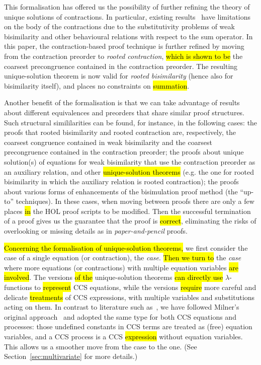 This formalisation has offered us the possibility of
further refining the theory of unique solutions of contractions.
In particular,  existing results~\cite{sangiorgi2017equations} have
limitations on the body of the contractions due to the
substitutivity problems of weak bisimilarity and other behavioural relations with respect
to the sum operator.
In this paper, the contraction-based proof technique is further
refined by moving from the contraction preorder to
\emph{rooted contraction}, \hl{which is shown to be} the coarsest
precongruence contained in the contraction preorder.
The resulting unique-solution theorem is now valid for
\emph{rooted bisimilarity} (hence also for bisimilarity itself), and places no 
constraints on \hl{summation}.

Another benefit of the formalisation is 
that we can take advantage of results about different 
equivalences and preorders that share similar proof structures.
Such structural simililarities can be found, for instance, in the
following cases: the proofs that rooted bisimilarity and rooted
contraction are, respectively, the coarsest congruence contained in
weak bisimilarity and the coarsest precongruence contained in the
contraction preorder; the proofs about unique solution(s) of equations
for weak bisimilarity that use the contraction preorder as an
auxiliary relation, and other \hl{unique-solution theorems} (e.g. the one
for rooted bisimilarity 
 in which the auxiliary relation is rooted contraction); the
proofs about various forms of enhancements of the bisimulation proof
method (the ``up-to'' techniques).
%
In these cases, when moving between proofs there are only a few places \hl{in}
the HOL proof scripts  to be modified.
Then the successful termination of a proof gives us the
 guarantee that the proof is \hl{correct}, eliminating the risks 
of overlooking or missing details as in \emph{paper-and-pencil} proofs.

\hl{Concerning the formalisation of unique-solution theorems,}
we first consider the case of a single equation (or contraction), the
\emph{\univariate case}.
\hl{Then we turn to} the \emph{\multivariate case} where more equations
  (or contractions) with multiple equation variables \hl{are involved}.
  The \univariate versions \hl{of the} unique-solution theorems
  \hl{can directly use}
$\lambda$-functions to \hl{represent} CCS equations,
while the \multivariate versions \hl{require}
more careful and delicate \hl{treatments} of CCS
expressions, with multiple variables and substitutions acting on them.
In contrast to literature such as~\cite{Gorrieri:2015jt},
we have followed Milner's original approach~\cite{milner1990operational} and adopted the same
type for both CCS equations and processes: those undefined constants
in CCS terms are treated as  (free) equation variables, and a CCS
process is a CCS \hl{expression} without equation variables.  %
This allows us a smoother move from the \univariate case to the \multivariate
one. (See Section~\ref{sec:multivariate} for more details.)

